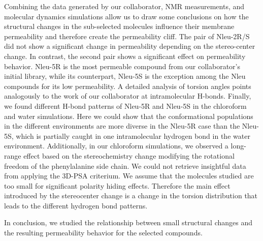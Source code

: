 Combining the data generated by our collaborator, NMR measurements, and molecular dynamics simulations allow us to draw some conclusions on how the structural changes in the sub-selected molecules influence their membrane permeability and therefore create the permeability cliff. 
The pair of Nleu-2R/S did not show a significant change in permeability depending on the stereo-center change. In contrast, the second pair shows a significant effect on permeability behavior. Nleu-5R is the most permeable compound from our collaborator's initial library, while its counterpart, Nleu-5S is the exception among the Nleu compounds for its low permeability. 
A detailed analysis of torsion angles points analogously to the work of our collaborator at intramolecular H-bonds.  \cite{Comeau2021}
Finally, we found different H-bond patterns of Nleu-5R and Nleu-5S in the chloroform and water simulations.  Here we could show that the conformational populations in the different environments are more diverse in the Nleu-5R case than the Nleu-5S, which is partially caught in one intramolecular hydrogen bond in the water environment.
Additionally, in our chloroform simulations, we observed a long-range effect based on the stereochemistry change modifying the rotational freedom of the phenylalanine side chain.
We could not retrieve insightful data from applying the 3D-PSA criterium. We assume that the molecules studied are too small for significant polarity hiding effects.  Therefore the main effect introduced by the stereocenter change is a change in the torsion distribution that leads to the different hydrogen bond patterns.

In conclusion, we studied the relationship between small structural changes and the resulting permeability behavior for the selected compounds. 

